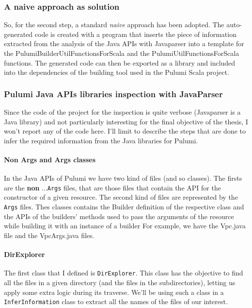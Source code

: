 \subsubsection{A naive approach as solution}
So, for the second step, a standard \textit{naive} approach has been adopted.
The auto-generated code is created with a program that inserts the piece of information extracted from the analysis of the Java APIs with Javaparser into a template for the PulumiBuilderUtilFunctionsForScala and the PulumiUtilFunctionsForScala functions.
The generated code can then be exported as a library and included into the dependencies of the building tool used in the Pulumi Scala project.

\subsubsection{Pulumi Java APIs libraries inspection with JavaParser}
Since the code of the project for the inspection is quite verbose (Javaparser is a Java library) and not particularly interesting for the final objective of the thesis, I won't report any of the code here.
I'll limit to describe the steps that are done to infer the required information from the Java libraries for Pulumi.

\paragraph{Non Args and Args classes}
In the Java APIs of Pulumi we have two kind of files (and so classes).
The firsts are the \textbf{non} ...\texttt{Args} files, that are those files that contain the API for the constructor of a given resource.
The second kind of files are represented by the \texttt{Args} files.
Thes classes contains the Builder definition of the respective class and the APIs of the builders' methods used to pass the arguments of the resource while building it with an instance of a builder
For example, we have the Vpc.java file and the VpcArgs.java files.

\paragraph{DirExplorer}
The first class that I defined is \texttt{DirExplorer}. This class has the objective to find all the files in a given directory (and the files in the subdirectories), letting us apply some extra logic during its traverse.
We'll be using such a class in a \texttt{InferInformation} class to extract all the names of the files of our interest.\\

